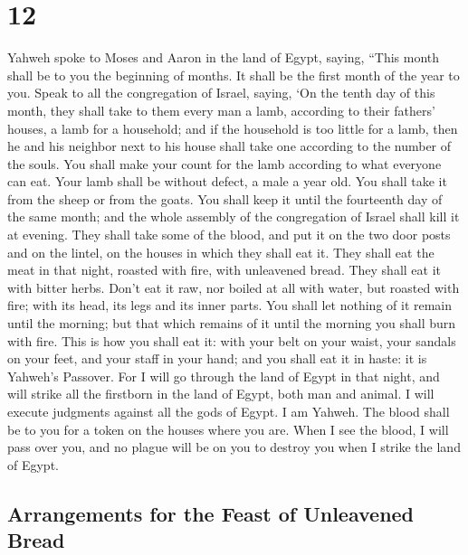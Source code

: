 \hypertarget{section-11}{%
\section{12}\label{section-11}}

 Yahweh spoke to Moses and Aaron in the land of Egypt,
saying,  ``This month shall be to you the beginning of
months. It shall be the first month of the year to you. 
Speak to all the congregation of Israel, saying, `On the tenth day of
this month, they shall take to them every man a lamb, according to their
fathers' houses, a lamb for a household;  and if the
household is too little for a lamb, then he and his neighbor next to his
house shall take one according to the number of the souls. You shall
make your count for the lamb according to what everyone can eat.
 Your lamb shall be without defect, a male a year old. You
shall take it from the sheep or from the goats.  You shall
keep it until the fourteenth day of the same month; and the whole
assembly of the congregation of Israel shall kill it at evening.
 They shall take some of the blood, and put it on the two
door posts and on the lintel, on the houses in which they shall eat it.
 They shall eat the meat in that night, roasted with fire,
with unleavened bread. They shall eat it with bitter herbs.
 Don't eat it raw, nor boiled at all with water, but
roasted with fire; with its head, its legs and its inner parts.
 You shall let nothing of it remain until the morning;
but that which remains of it until the morning you shall burn with fire.
 This is how you shall eat it: with your belt on your
waist, your sandals on your feet, and your staff in your hand; and you
shall eat it in haste: it is Yahweh's Passover.  For I
will go through the land of Egypt in that night, and will strike all the
firstborn in the land of Egypt, both man and animal. I will execute
judgments against all the gods of Egypt. I am Yahweh. 
The blood shall be to you for a token on the houses where you are. When
I see the blood, I will pass over you, and no plague will be on you to
destroy you when I strike the land of Egypt.

\hypertarget{arrangements-for-the-feast-of-unleavened-bread}{%
\subsection{Arrangements for the Feast of Unleavened
Bread}\label{arrangements-for-the-feast-of-unleavened-bread}}

